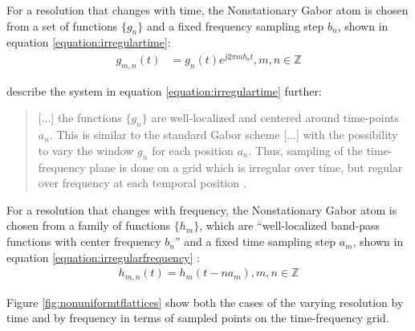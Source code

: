 \documentclass[report.tex]{subfiles}
\begin{document}
For a resolution that changes with time, the Nonstationary Gabor atom is chosen from a set of functions $\{g_{n}\}$ and a fixed frequency sampling step $b_{n}$, shown in equation \eqref{equation:irregulartime}:
\begin{align}\tag{14}\label{equation:irregulartime}
	g_{m,n}(t) &= g_{n}(t)e^{j2\pi m b_{n}t}, m,n \in \mathbb{Z}
\end{align}

\citeauthor{balazs} describe the system in equation \eqref{equation:irregulartime} further:

\begin{quote}
	[...] the functions $\{g_{n}\}$ are well-localized and centered around time-points $a_{n}$. This is similar to the standard Gabor scheme [...] with the possibility to vary the window $g_{n}$ for each position $a_{n}$. Thus, sampling of the time-frequency plane is done on a grid which is irregular over time, but regular over frequency at each temporal position \parencite[1485]{balazs}.
\end{quote}

For a resolution that changes with frequency, the Nonstationary Gabor atom is chosen from a family of functions $\{h_{m}\}$, which are ``well-localized band-pass functions with center frequency $b_{n}$'' and a fixed time sampling step $a_{m}$, shown in equation \eqref{equation:irregularfrequency} \parencite[1486]{balazs}:
\begin{align}\tag{15}\label{equation:irregularfrequency}
	h_{m,n}(t) = h_{m}(t - na_{m}), m,n \in \mathbb{Z}
\end{align}

Figure \ref{fig:nonuniformtflattices} show both the cases of the varying resolution by time and by frequency in terms of sampled points on the time-frequency grid.
\end{document}
